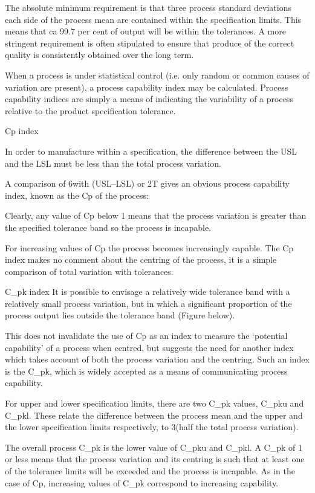 The absolute minimum requirement is that three process standard deviations each side of the process mean are contained within the specification limits. This means that ca 99.7 per cent of output will be within the tolerances. A more stringent requirement is often stipulated to ensure that produce of the correct quality is consistently obtained over the long term.

When a process is under statistical control (i.e. only random or common
causes of variation are present), a process capability index may be calculated. Process capability indices are simply a means of indicating the variability of a process relative to the product specification tolerance.

Cp index

In order to manufacture within a specification, the difference between the
USL and the LSL must be less than the total process variation.

A comparison of 6\sigma with (USL–LSL) or 2T gives an obvious process capability index, known as the Cp of the process:

 

Clearly, any value of Cp below 1 means that the process variation is greater than the specified tolerance band so the process is incapable. 

For increasing values of Cp the process becomes increasingly capable. The Cp index makes no comment about the centring of the process, it is a simple comparison of total variation with tolerances.

C_{pk} index
It is possible to envisage a relatively wide tolerance band with a relatively
small process variation, but in which a significant proportion of the process output lies outside the tolerance band (Figure below). 
 

This does not invalidate the use of Cp as an index to measure the ‘potential capability’ of a process when centred, but suggests the need for another index which takes account of both the process variation and the centring. Such an index is the C_{pk}, which is widely accepted as a means of communicating process capability.

For upper and lower specification limits, there are two C_{pk} values,
C_{pk}u and C_{pk}l. These relate the difference between the process mean and the upper and the lower specification limits respectively, to 3\sigma (half the total process variation).
 
The overall process C_{pk} is the lower value of C_{pk}u and C_{pk}l. A C_{pk} of 1 or less means that the process variation and its centring is such that at least one of the tolerance limits will be exceeded and the process is incapable. As in the case of Cp, increasing values of C_{pk} correspond to increasing capability. 

